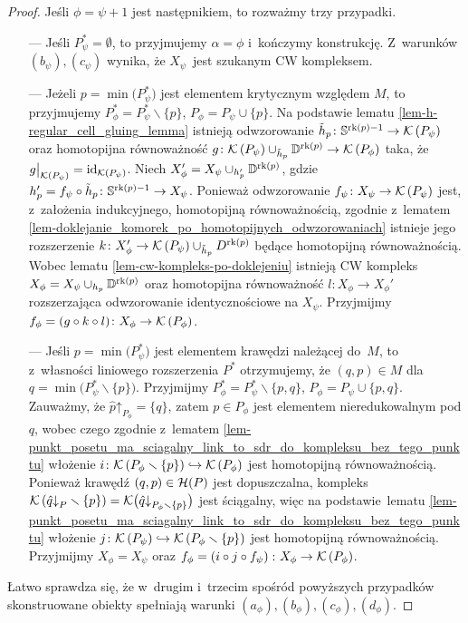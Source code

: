 \begin{proof}
Jeśli $\phi=\psi+1$ jest następnikiem, to rozważmy trzy przypadki.
\begin{itemize}
\item[---] Jeśli $P^*_\psi=\emptyset$, to przyjmujemy $\alpha=\phi$ i~kończymy konstrukcję. Z~warunków $(b_\psi), (c_\psi)$ wynika, że $X_\psi$~jest szukanym CW kompleksem.
\item[---] Jeżeli $p=\min\bigl(P^*_{\psi}\bigr)$ jest elementem krytycznym względem $M$, to przyjmujemy $P^*_\phi=P^*_\psi\smallsetminus\{p\}$, $P_\phi=P_\psi\cup\{p\}$. Na podstawie lematu \ref{lem-h-regular_cell_gluing_lemma} istnieją odwzorowanie  $\tilde{h}_p\colon \mathbb{S}^{\operatorname{rk}(p)-1}\to \mathcal{K}\left(P_\psi\right)$ oraz homotopijna równoważność $g\colon \mathcal{K}\left(P_\psi\right)\cup_{\tilde{h}_p} \mathbb{D}^{\operatorname{rk}(p)}\to \mathcal{K}\left(P_\phi\right)$ taka, że  $g\big |_{\mathcal{K}\left(P_\psi\right)}=\operatorname{id}_{\mathcal{K}\left(P_\psi\right)}$. Niech $X_\phi'=X_\psi\cup_{h_p'} \mathbb{D}^{\operatorname{rk}(p)}$, gdzie $h_p'=f_\psi\circ \tilde{h}_p\colon \mathbb{S}^{\operatorname{rk}(p)-1}\to X_\psi$. Ponieważ odwzorowanie $f_\psi\colon X_\psi\to \mathcal{K}\left(P_\psi\right)$ jest, z~założenia indukcyjnego, homotopijną równoważnością, zgodnie z~lematem \ref{lem-doklejanie_komorek_po_homotopijnych_odwzorowaniach} istnieje jego rozszerzenie $k\colon X_\phi'\to \mathcal{K}\left(P_\psi\right)\cup_{\tilde{h}_p} D^{\operatorname{rk}(p)}$ będące homotopijną równoważnością. Wobec lematu \ref{lem-cw-kompleks-po-doklejeniu} istnieją CW kompleks $X_\phi=X_\psi\cup_{h_p} \mathbb{D}^{\operatorname{rk}(p)}$ oraz homotopijna równoważność $l\colon X_\phi\to X_\phi'$ rozszerzająca odwzorowanie identycznościowe na $X_\psi$. Przyjmijmy $f_\phi=(g\circ k\circ l)\colon X_\phi\to \mathcal{K}\left(P_\phi\right)$.
\item[---] Jeśli $p=\min\bigl(P^*_{\psi}\bigr)$ jest elementem krawędzi należącej do~$M$, to z~własności liniowego rozszerzenia $P^*$ otrzymujemy, że $(q,p)\in M$ dla $q=\min\bigl(P^*_{\psi}\smallsetminus\{p\}\bigr)$. Przyjmijmy $P^*_{\phi}=P^*_\psi\smallsetminus\{p,q\}$, $P_{\phi}=P_\psi\cup\{p,q\}$. Zauważmy, że $\hat{p}\mathord{\uparrow}_{P_\phi}=\{q\}$, zatem $p\in P_\phi$ jest elementem nieredukowalnym pod $q$, wobec czego zgodnie z~lematem \ref{lem-punkt_posetu_ma_sciagalny_link_to_sdr_do_kompleksu_bez_tego_punktu} włożenie $i\colon \mathcal{K}\left(P_\phi\smallsetminus\{p\}\right)\hookrightarrow \mathcal{K}\left(P_\phi\right)$ jest homotopijną równoważnością. Ponieważ krawędź $(q,p)\in \mathcal{H}(P)$ jest dopuszczalna, kompleks $\mathcal{K}\left(\hat{q}\mathord{\downarrow}_P\smallsetminus\{p\}\right)=\mathcal{K}\bigl(\hat{q}\mathord{\downarrow}_{P_\phi\smallsetminus\{p\}}\bigr)$ jest ściągalny, więc na podstawie~lematu \ref{lem-punkt_posetu_ma_sciagalny_link_to_sdr_do_kompleksu_bez_tego_punktu} włożenie $j\colon \mathcal{K}\left(P_\psi\right)\hookrightarrow \mathcal{K}\left(P_\phi\smallsetminus\{p\}\right)$ jest homotopijną równoważnością. Przyjmijmy $X_\phi=X_\psi$ oraz \mbox{$f_\phi=\left(i \circ j \circ f_\psi\right)\colon X_\phi\to \mathcal{K}\left(P_\phi\right)$}.
\end{itemize}
Łatwo sprawdza się, że w~drugim i~trzecim spośród powyższych przypadków skonstruowane obiekty spełniają warunki $(a_\phi), (b_\phi), (c_\phi), (d_\phi)$.


\end{proof}
